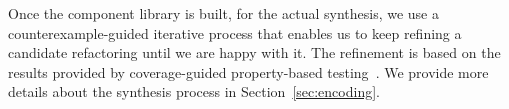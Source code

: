 \documentclass[sigconf,review,anonymous]{acmart}
\begin{document}
Once the component library is built, for the actual synthesis,
we use a counterexample-guided iterative process that enables us
to keep refining a candidate refactoring until we are happy with it.
The refinement is based on the results provided by 
coverage-guided property-based testing~\cite{DBLP:conf/issta/PadhyeLS19}.
We provide more details about %
the synthesis process in Section~\ref{sec:encoding}.



\end{document}
